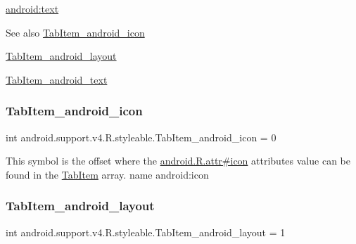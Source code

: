 {\ttfamily \hyperlink{classandroid_1_1support_1_1v4_1_1R_1_1styleable_a4a41f221a6dff9f2540c4311a480ec64}{android\+:text}}

\begin{DoxySeeAlso}{See also}
\hyperlink{classandroid_1_1support_1_1v4_1_1R_1_1styleable_a691f8166d05ca47d403a871ffcfc8338}{Tab\+Item\+\_\+android\+\_\+icon} 

\hyperlink{classandroid_1_1support_1_1v4_1_1R_1_1styleable_a9f91c8afe073d31917ea616c09636f9b}{Tab\+Item\+\_\+android\+\_\+layout} 

\hyperlink{classandroid_1_1support_1_1v4_1_1R_1_1styleable_a4a41f221a6dff9f2540c4311a480ec64}{Tab\+Item\+\_\+android\+\_\+text} 
\end{DoxySeeAlso}
\mbox{\label{classandroid_1_1support_1_1v4_1_1R_1_1styleable_a691f8166d05ca47d403a871ffcfc8338}} 
\subsubsection{\texorpdfstring{Tab\+Item\+\_\+android\+\_\+icon}{TabItem\_android\_icon}}
{\footnotesize\ttfamily int android.\+support.\+v4.\+R.\+styleable.\+Tab\+Item\+\_\+android\+\_\+icon = 0\hspace{0.3cm}{\ttfamily [static]}}

This symbol is the offset where the \hyperlink{}{android.\+R.\+attr\#icon} attribute\textquotesingle{}s value can be found in the \hyperlink{classandroid_1_1support_1_1v4_1_1R_1_1styleable_ad680ed3459bf81f422f0dcae8c50dfc3}{Tab\+Item} array.  name android\+:icon \mbox{\label{classandroid_1_1support_1_1v4_1_1R_1_1styleable_a9f91c8afe073d31917ea616c09636f9b}} 
\subsubsection{\texorpdfstring{Tab\+Item\+\_\+android\+\_\+layout}{TabItem\_android\_layout}}
{\footnotesize\ttfamily int android.\+support.\+v4.\+R.\+styleable.\+Tab\+Item\+\_\+android\+\_\+layout = 1\hspace{0.3cm}{\ttfamily [static]}}

